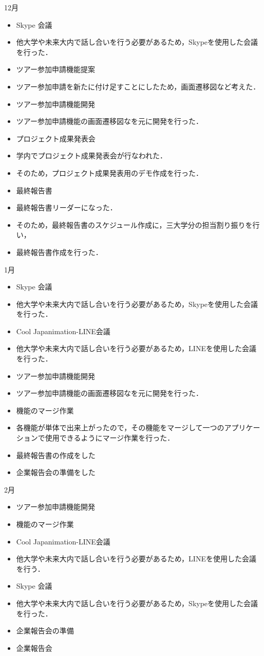 12月
\begin{itemize}
\item Skype 会議
\item   他大学や未来大内で話し合いを行う必要があるため，Skypeを使用した会議を行った．
\item ツアー参加申請機能提案
\item    ツアー参加申請を新たに付け足すことにしたため，画面遷移図など考えた．　
\item ツアー参加申請機能開発
\item    ツアー参加申請機能の画面遷移図なを元に開発を行った．
\item プロジェクト成果発表会
\item    学内でプロジェクト成果発表会が行なわれた．
\item    そのため，プロジェクト成果発表用のデモ作成を行った．
\item 最終報告書
\item   最終報告書リーダーになった．
\item   そのため，最終報告書のスケジュール作成に，三大学分の担当割り振りを行い，
\item   最終報告書作成を行った．
\end{itemize}

1月
\begin{itemize}
\item Skype 会議
\item   他大学や未来大内で話し合いを行う必要があるため，Skypeを使用した会議を行った．
\item Cool Japanimation-LINE会議
\item   他大学や未来大内で話し合いを行う必要があるため，LINEを使用した会議を行った．
\item ツアー参加申請機能開発
\item   ツアー参加申請機能の画面遷移図なを元に開発を行った．	
\item 機能のマージ作業
\item   各機能が単体で出来上がったので，その機能をマージして一つのアプリケーションで使用できるようにマージ作業を行った．
\item 最終報告書の作成をした
\item 企業報告会の準備をした
\end{itemize}

2月
\begin{itemize}
\item ツアー参加申請機能開発
\item 機能のマージ作業
\item Cool Japanimation-LINE会議
\item   他大学や未来大内で話し合いを行う必要があるため，LINEを使用した会議を行う．
\item Skype 会議
\item   他大学や未来大内で話し合いを行う必要があるため，Skypeを使用した会議を行った．
\item 企業報告会の準備
\item 企業報告会
\end{itemize}

